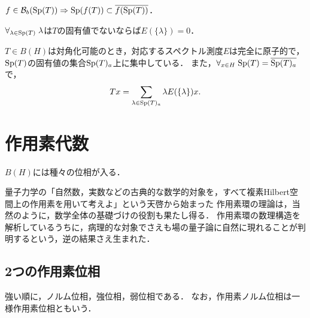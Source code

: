 \documentclass[uplatex,dvipdfmx]{jsreport}
\begin{document}
\begin{corollary}
    $f\in \mathcal{B}_b(\mathrm{Sp}(T))\Rightarrow\mathrm{Sp}(f(T))\subset\overline{f(\mathrm{Sp}(T))}$．
\end{corollary}
\begin{corollary}
    $\forall_{\lambda\in\mathrm{Sp}(T)}\;\lambda$は$T$の固有値でないならば$E(\{\lambda\})=0$．
\end{corollary}
\begin{corollary}
    $T\in B(H)$は対角化可能のとき，対応するスペクトル測度$E$は完全に原子的で，$\mathrm{Sp}(T)$の固有値の集合$\mathrm{Sp}(T)_a$上に集中している．
    また，$\forall_{x\in H}\;\mathrm{Sp}(T)=\overline{\mathrm{Sp}(T)_a}$で，
    \[Tx=\sum_{\lambda\in\mathrm{Sp}(T)_a}\lambda E(\{\lambda\})x.\]
\end{corollary}

\section{作用素代数}

\begin{tcolorbox}[colframe=ForestGreen, colback=ForestGreen!10!white,breakable,colbacktitle=ForestGreen!40!white,coltitle=black,fonttitle=\bfseries\sffamily,
title=]
    $B(H)$には種々の位相が入る．

    量子力学の「自然数，実数などの古典的な数学的対象を，すべて複素Hilbert空間上の作用素を用いて考えよ」という天啓から始まった
    作用素環の理論は，当然のように，数学全体の基礎づけの役割も果たし得る．
    作用素環の数理構造を解析しているうちに，病理的な対象でさえも場の量子論に自然に現れることが判明するという，逆の結果さえ生まれた．
\end{tcolorbox}

\subsection{2つの作用素位相}

\begin{tcolorbox}[colframe=ForestGreen, colback=ForestGreen!10!white,breakable,colbacktitle=ForestGreen!40!white,coltitle=black,fonttitle=\bfseries\sffamily,
title=]
    強い順に，ノルム位相，強位相，弱位相である．
    なお，作用素ノルム位相は一様作用素位相ともいう．
\end{tcolorbox}
\end{document}
